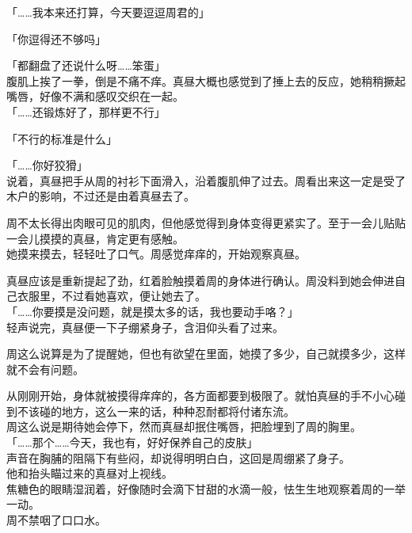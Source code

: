 「……我本来还打算，今天要逗逗周君的」

「你逗得还不够吗」

「都翻盘了还说什么呀……笨蛋」\\

腹肌上挨了一拳，倒是不痛不痒。真昼大概也感觉到了捶上去的反应，她稍稍撅起嘴唇，好像不满和感叹交织在一起。\\

「……还锻炼好了，那样更不行」

「不行的标准是什么」

「……你好狡猾」\\

说着，真昼把手从周的衬衫下面滑入，沿着腹肌伸了过去。周看出来这一定是受了木户的影响，不过还是由着真昼去了。

周不太长得出肉眼可见的肌肉，但他感觉得到身体变得更紧实了。至于一会儿贴贴一会儿摸摸的真昼，肯定更有感触。\\

她摸来摸去，轻轻吐了口气。周感觉痒痒的，开始观察真昼。

真昼应该是重新提起了劲，红着脸触摸着周的身体进行确认。周没料到她会伸进自己衣服里，不过看她喜欢，便让她去了。\\

「……你要摸是没问题，就是摸太多的话，我也要动手咯？」\\

轻声说完，真昼便一下子绷紧身子，含泪仰头看了过来。

周这么说算是为了提醒她，但也有欲望在里面，她摸了多少，自己就摸多少，这样就不会有问题。

从刚刚开始，身体就被摸得痒痒的，各方面都要到极限了。就怕真昼的手不小心碰到不该碰的地方，这么一来的话，种种忍耐都将付诸东流。\\

周这么说是期待她会停下，然而真昼却抿住嘴唇，把脸埋到了周的胸里。\\

「……那个……今天，我也有，好好保养自己的皮肤」\\

声音在胸脯的阻隔下有些闷，却说得明明白白，这回是周绷紧了身子。\\

他和抬头瞄过来的真昼对上视线。\\

焦糖色的眼睛湿润着，好像随时会滴下甘甜的水滴一般，怯生生地观察着周的一举一动。\\

周不禁咽了口口水。\\

